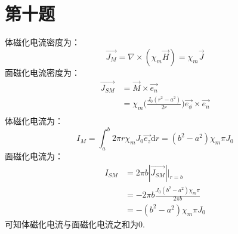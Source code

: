 \documentclass[a4paper]{article}
\begin{document}
	\section{第十题}
		体磁化电流密度为：
		\begin{equation}
			\vec{J_M} = \nabla \times (\chi_m \vec{H})=\chi_m \vec{J}
		\end{equation}
		面磁化电流密度为：
		\begin{equation}
			\begin{split}
				\vec{J_{SM}} &= \vec{M} \times \vec{e_n}\\
				&= \chi_m \bigg(\frac{J_0 (r^2 - a^2)}{2r} \bigg) \vec{e_\phi} \times \vec{e_n}\\
			\end{split}
		\end{equation}
		体磁化电流为：
		\begin{equation}
			I_M = \int _a ^b 2\pi r\chi_m J_0 \vec{e_z}\mathrm{d}r = (b^2 - a^2)\chi_m\pi J_0
		\end{equation}
		面磁化电流为：
		\begin{equation}
			\begin{split}
				I_{SM} &= 2\pi b|\vec{J_{SM}}| \bigg| _{r=b}\\
				&= -2\pi b \frac{J_0(b^2 - a^2)\chi_m\pi}{2\pi b}\\
				&= -(b^2 - a^2)\chi_m \pi J_0
			\end{split}
		\end{equation}
		可知体磁化电流与面磁化电流之和为0.
\end{document}
